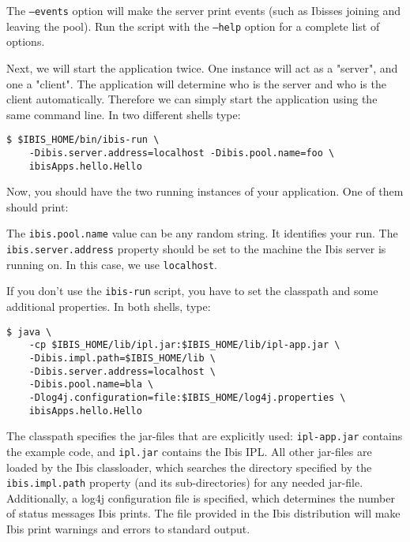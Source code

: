 \documentclass[10pt]{article}
\begin{document}
The \texttt{--events} option will make the server print events (such as
Ibisses joining and leaving the pool). Run the script with the
\texttt{--help} option for a complete list of options.

Next, we will start the application twice. One instance will act as a  
"server", and one a "client". The application will determine who is
the server and who is the client automatically. Therefore we can simply start the application using
the same command line. In two different shells type:

\noindent
{\small
\begin{verbatim}
$ $IBIS_HOME/bin/ibis-run \
    -Dibis.server.address=localhost -Dibis.pool.name=foo \
    ibisApps.hello.Hello
\end{verbatim}
}
\noindent
Now, you should have the two running instances of your application. One of them should print:

 \noindent 

The \texttt{ibis.pool.name} value can be any random string.  It
identifies your run. The \texttt{ibis.server.address} property should be
set to the machine the Ibis server is running on. In this case, we use
\texttt{localhost}.

If you don't use the \texttt{ibis-run} script, you have to set the classpath
and some additional properties. In both shells, type:

\noindent
{\small
\begin{verbatim}
$ java \
    -cp $IBIS_HOME/lib/ipl.jar:$IBIS_HOME/lib/ipl-app.jar \
    -Dibis.impl.path=$IBIS_HOME/lib \
    -Dibis.server.address=localhost \
    -Dibis.pool.name=bla \
    -Dlog4j.configuration=file:$IBIS_HOME/log4j.properties \
    ibisApps.hello.Hello
\end{verbatim}
}
\noindent
The classpath specifies the jar-files that are explicitly used:
\texttt{ipl-app.jar} contains the example code, and \texttt{ipl.jar} contains
the Ibis IPL. All other jar-files are loaded by the Ibis classloader, which
searches the directory specified by the \texttt{ibis.impl.path} property
(and its sub-directories) for any needed jar-file.
Additionally, a log4j configuration file is specified, which determines the
number of status messages Ibis prints. The file provided in the Ibis
distribution will make Ibis print
warnings and errors to standard output.
\end{document}
